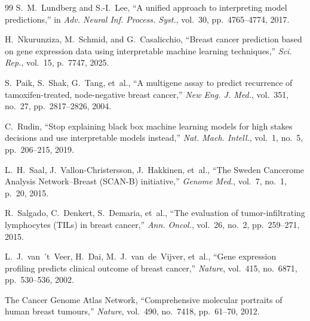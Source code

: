 \documentclass[journal]{IEEEtran}
\begin{document}
\begin{thebibliography}{99}
S.~M.~Lundberg and S.-I.~Lee, ``A unified approach to interpreting model predictions,'' in \textit{Adv. Neural Inf. Process. Syst.}, vol.~30, pp.~4765--4774, 2017.

H.~Nkurunziza, M.~Schmid, and G.~Casalicchio, ``Breast cancer prediction based on gene expression data using interpretable machine learning techniques,'' \textit{Sci. Rep.}, vol.~15, p.~7747, 2025.

S.~Paik, S.~Shak, G.~Tang, et~al., ``A multigene assay to predict recurrence of tamoxifen-treated, node-negative breast cancer,'' \textit{New Eng. J. Med.}, vol.~351, no.~27, pp.~2817--2826, 2004.

C.~Rudin, ``Stop explaining black box machine learning models for high stakes decisions and use interpretable models instead,'' \textit{Nat. Mach. Intell.}, vol.~1, no.~5, pp.~206--215, 2019.

L.~H.~Saal, J.~Vallon-Christersson, J.~Hakkinen, et~al., ``The Sweden Cancerome Analysis Network--Breast (SCAN-B) initiative,'' \textit{Genome Med.}, vol.~7, no.~1, p.~20, 2015.

R.~Salgado, C.~Denkert, S.~Demaria, et~al., ``The evaluation of tumor-infiltrating lymphocytes (TILs) in breast cancer,'' \textit{Ann. Oncol.}, vol.~26, no.~2, pp.~259--271, 2015.

L.~J.~van~'t~Veer, H.~Dai, M.~J.~van~de~Vijver, et~al., ``Gene expression profiling predicts clinical outcome of breast cancer,'' \textit{Nature}, vol.~415, no.~6871, pp.~530--536, 2002.

The Cancer Genome Atlas Network, ``Comprehensive molecular portraits of human breast tumours,'' \textit{Nature}, vol.~490, no.~7418, pp.~61--70, 2012.

\end{thebibliography}
\end{document}
